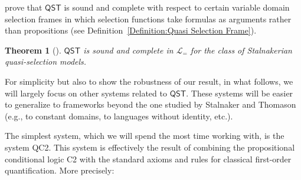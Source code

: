 \documentclass[12pt]{article}
\newtheorem{theorem}{Theorem}
\begin{document}
\cite{StalnakerThomason1970} prove that $\mathsf{QST}$ is sound and complete with respect to certain variable domain selection frames in which selection functions take formulas as arguments rather than propositions (see Definition~\ref{Definition:Quasi Selection Frame}).

\begin{theorem}[\cite{StalnakerThomason1970}]
\label{thm:QST-comp}
    $\mathsf{QST}$ is sound and complete in $\mathcal{L}_=$ for the class of Stalnakerian quasi-selection models. 
\end{theorem}

For simplicity but also to show the robustness of our result, in what follows, we will largely focus on other systems related to $\mathsf{QST}$. 
These systems will be easier to generalize to frameworks beyond the one studied by Stalnaker and Thomason (e.g., to constant domains, to languages without identity, etc.).  

The simplest system, which we will spend the most time working with, is the system \textsf{QC2}. 
This system is effectively the result of combining the propositional conditional logic \textsf{C2} with the standard axioms and rules for classical first-order quantification. 
More precisely:
\end{document}
